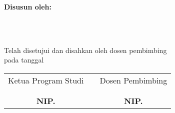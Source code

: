 \makeatletter
\def\approvalpage{%
	\chapter*{\approvalname}%
	\begin{center}
		\begin{doublespace}
			\vspace{0.7cm}
			\MakeUppercase{\normalfont\bfseries\expandafter{\@booktitle}}\\
			\vspace{0.7cm}
			\MakeUppercase{\normalfont\bfseries\@titleidn}\par\nobreak
			\vspace{0.5cm}
			\vspace{1.0cm}
			\textbf{Disusun oleh:}\\
			\begin{singlespace}
				\underline{\bfseries \@fullname}\\
				\textbf{\@nim}\\
			\end{singlespace}
			\vspace{1.0cm}
			Telah disetujui dan disahkan oleh dosen pembimbing\\
			pada tanggal \@approvaldate
			\vspace{1.0cm}
			\begin{singlespace}
				\begin{tabular}{ccc}
					Ketua Program Studi \@major            &              & Dosen Pembimbing           \\
					\vspace{1cm}                           & \vspace{1cm} & \vspace{1cm}               \\
					\textbf{\underline{\@firstsupervisor}} &              &
					\textbf{\underline{\@secondsupervisor}}                                            \\
					\bfseries NIP. \@firstnip              &              & \bfseries NIP. \@secondnip
				\end{tabular}
			\end{singlespace}

		\end{doublespace}
	\end{center}
}
\makeatother

\approvalpage
